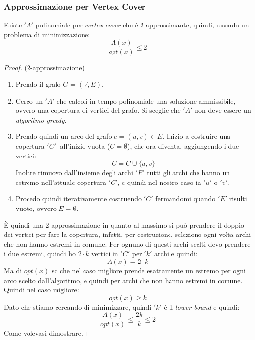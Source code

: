 										\subsubsection{Approssimazione per Vertex Cover}
										\begin{definizione}
											Esiste $ 'A' $ polinomiale per \textit{vertex-cover} che è 2-approssimante,
											quindi, essendo un problema di minimizzazione:
											\[\frac{A(x)}{opt(x)}\leq 2\]
										\end{definizione}
										\begin{proof} (2-approssimazione)
											\begin{enumerate}
												\item  Prendo il grafo $G=(V,E)$.
												\item  Cerco un $ 'A' $ che calcoli in tempo polinomiale una soluzione ammissibile,
												      ovvero una copertura di vertici del grafo. Si sceglie che $ 'A' $ non deve essere
												      un \textit{algoritmo greedy}.
												\item   Prendo quindi un arco del grafo $e=(u,v)\in E$.  Inizio a costruire una
												      copertura $ 'C' $, all'inizio vuota ($C=\emptyset$), che ora diventa, aggiungendo
												      i due vertici:
												      \[C=C\cup\{u,v\}\]
												      Inoltre rimuovo dall'insieme degli archi $ 'E' $ tutti gli archi che hanno un
												      estremo nell'attuale copertura $ 'C' $, e quindi nel nostro caso in $ 'u' $ o $ 'v' $.
												\item Procedo quindi iterativamente costruendo $ 'C' $ fermandomi quando $ 'E' $ risulti
												      vuoto, ovvero $E=\emptyset$.
											\end{enumerate}
											
											 
											È quindi una 2-approssimazione in quanto al massimo si può prendere il doppio
											dei vertici per fare la copertura, infatti, per costruzione, seleziono ogni
											volta archi che non hanno estremi in comune. Per ognuno di questi archi scelti
											devo prendere i due estremi, quindi ho $2\cdot k$ vertici in $ 'C' $ per $ 'k' $ archi
											e quindi:
											\[A(x)=2\cdot k\]
											Ma di $opt(x)$ so che nel caso migliore prende esattamente un estremo per ogni
											arco scelto dall'algoritmo, e quindi per archi che non hanno estremi in
											comune. Quindi nel caso migliore:
											\[opt(x)\geq k\]
											Dato che stiamo cercando di minimizzare, quindi $ 'k' $ è il \textit{lower bound} e
											quindi:
											\[\frac{A(x)}{opt(x)}\leq\frac{2k}{k}\leq 2\]
											Come volevasi dimostrare.
										\end{proof}
